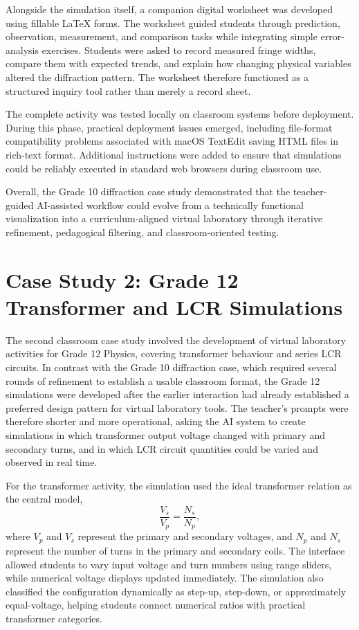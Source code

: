 \documentclass{iopjournal}
\begin{document}
Alongside the simulation itself, a companion digital worksheet was developed using fillable \LaTeX{} forms. The worksheet guided students through prediction, observation, measurement, and comparison tasks while integrating simple error-analysis exercises. Students were asked to record measured fringe widths, compare them with expected trends, and explain how changing physical variables altered the diffraction pattern. The worksheet therefore functioned as a structured inquiry tool rather than merely a record sheet.

The complete activity was tested locally on classroom systems before deployment. During this phase, practical deployment issues emerged, including file-format compatibility problems associated with macOS TextEdit saving HTML files in rich-text format. Additional instructions were added to ensure that simulations could be reliably executed in standard web browsers during classroom use.


Overall, the Grade 10 diffraction case study demonstrated that the teacher-guided AI-assisted workflow could evolve from a technically functional visualization into a curriculum-aligned virtual laboratory through iterative refinement, pedagogical filtering, and classroom-oriented testing.

\section{Case Study 2: Grade 12 Transformer and LCR Simulations}

The second classroom case study involved the development of virtual laboratory activities for Grade 12 Physics, covering transformer behaviour and series LCR circuits. In contrast with the Grade 10 diffraction case, which required several rounds of refinement to establish a usable classroom format, the Grade 12 simulations were developed after the earlier interaction had already established a preferred design pattern for virtual laboratory tools. The teacher's prompts were therefore shorter and more operational, asking the AI system to create simulations in which transformer output voltage changed with primary and secondary turns, and in which LCR circuit quantities could be varied and observed in real time.

For the transformer activity, the simulation used the ideal transformer relation as the central model,
\begin{equation}
\frac{V_s}{V_p}=\frac{N_s}{N_p},
\end{equation}
where $V_p$ and $V_s$ represent the primary and secondary voltages, and $N_p$ and $N_s$ represent the number of turns in the primary and secondary coils. The interface allowed students to vary input voltage and turn numbers using range sliders, while numerical voltage displays updated immediately. The simulation also classified the configuration dynamically as step-up, step-down, or approximately equal-voltage, helping students connect numerical ratios with practical transformer categories.
\end{document}
